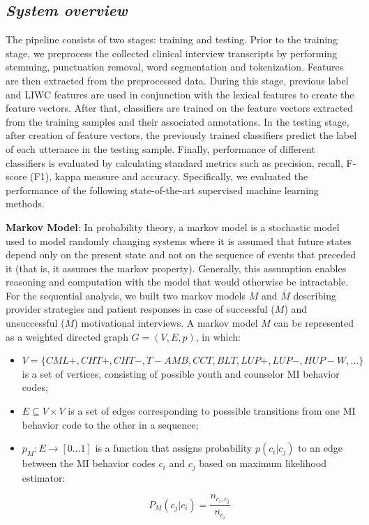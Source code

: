 \documentclass{amia}
\begin{document}
\subsection*{\textit{System overview}}
The pipeline consists of two stages: training and testing. Prior to the training stage, we preprocess the collected clinical interview transcripts by performing stemming, punctuation removal, word segmentation and tokenization. Features are then extracted from the preprocessed data. During this stage, previous label and LIWC features are used in conjunction with the lexical features to create the feature vectors. After that, classifiers are trained on the feature vectors extracted from the training samples and their associated annotations. In the testing stage, after creation of feature vectors, the previously trained classifiers predict the label of each utterance in the testing sample. Finally, performance of different classifiers is evaluated by calculating standard metrics such as precision, recall, F-score (F1), kappa measure and accuracy. Specifically, we evaluated the performance of the following state-of-the-art supervised machine learning methods.

\textbf {Markov Model}: In probability theory, a markov model \cite{} is a stochastic model used to model randomly changing systems where it is assumed that future states depend only on the present state and not on the sequence of events that preceded it (that is, it assumes the markov property). Generally, this assumption enables reasoning and computation with the model that would otherwise be intractable. For the sequential analysis, we built two markov models $M$ and $\overline{M}$ describing provider strategies and patient responses in case of successful ($M$) and unsuccessful ($\overline{M}$) motivational interviews. A markov model $M$ can be represented as a weighted directed graph $G = (V, E, p)$, in which:

\begin{itemize}
\item $V = \{CML+, CHT+, CHT-, T-AMB, CCT, BLT, LUP+, LUP-, HUP-W, ...\}$ is a set of vertices, consisting of possible youth and counselor MI behavior codes;
\item $E \subseteq V \times V$ is a set of edges corresponding to posssible transitions from one MI behavior code to the other in a sequence;
\item $p_M:E\rightarrow[0...1]$ is a function that assigns probability $p(c_i|c_j)$ to an edge between the MI behavior codes $c_i$ and $c_j$ based on maximum likelihood estimator:

\begin{equation}
P_M(c_j|c_i) = \frac{n_{c_i,c_j}}{n_{c_i}}
\end{equation}

\end{itemize}
\end{document}
